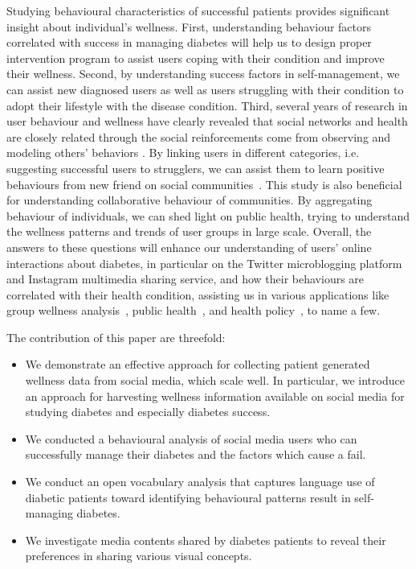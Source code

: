 \documentclass{acm_proc_article-sp}
\begin{document}
Studying behavioural characteristics of successful patients provides significant insight about individual's wellness. First, understanding behaviour factors correlated with success in managing diabetes will help us to design proper intervention program to assist users coping with their condition and improve their wellness. Second, by understanding success factors in self-management, we can assist new diagnosed users as well as users struggling with their condition to adopt their lifestyle with the disease condition. Third, several years of research in user behaviour and wellness have clearly revealed that social networks and health are closely related through the social reinforcements come from observing and modeling others' behaviors \cite{ruths2014social}. By linking users in different categories, i.e. suggesting successful users to strugglers, we can assist them to learn positive behaviours from new friend on social communities~\cite{maibach1995moving,korda2013harnessing,hawn2009take}. This study is also beneficial for understanding collaborative behaviour of communities. By aggregating behaviour of individuals, we can shed light on public health, trying to understand the wellness patterns and trends of user groups in large scale. Overall, the answers to these questions will enhance our understanding of users' online interactions about diabetes, in particular on the Twitter microblogging platform and Instagram multimedia sharing service, and how their behaviours are correlated with their health condition, assisting us in various applications like group wellness analysis~\cite{tang2011group}, public health~\cite{hawn2009take,luxton2012social}, and health policy~\cite{murray1996evidence}, to name a few.


The contribution of this paper are threefold:
\begin{itemize}
\item We demonstrate an effective approach for collecting patient generated wellness data from social media, which scale well. In particular, we introduce an approach for harvesting wellness information available on social media for studying diabetes and especially diabetes success.
\item We conducted a behavioural analysis of social media users who can successfully manage their diabetes and the factors which cause a fail.
\item We conduct an open vocabulary analysis that captures language use of diabetic patients toward identifying behavioural patterns result in self-managing diabetes.
\item We investigate media contents shared by diabetes patients to reveal their preferences in sharing various visual concepts.
\end{itemize}
\end{document}
